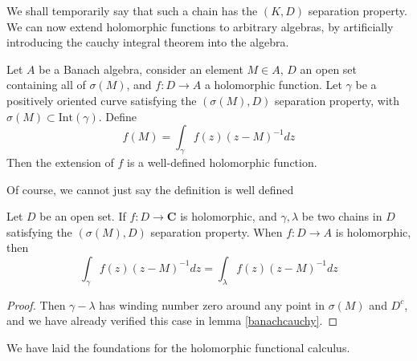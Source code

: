 We shall temporarily say that such a chain has the $(K,D)$ separation property. We can now extend holomorphic functions to arbitrary algebras, by artificially introducing the cauchy integral theorem into the algebra.

\begin{definition}
    Let $A$ be a Banach algebra, consider an element $M \in A$, $D$ an open set containing all of $\sigma(M)$, and $f:D \to A$ a holomorphic function. Let $\gamma$ be a positively oriented curve satisfying the $(\sigma(M), D)$ separation property, with $\sigma(M) \subset \text{Int}(\gamma)$. Define
    \[ f(M) = \int_\gamma f(z) (z - M)^{-1} dz \]
    Then the extension of $f$ is a well-defined holomorphic function.
\end{definition}

Of course, we cannot just say the definition is well defined

\begin{lemma}
    Let $D$ be an open set. If $f: D \to \mathbf{C}$ is holomorphic, and $\gamma, \lambda$ be two chains in $D$ satisfying the $(\sigma(M), D)$ separation property. When $f: D \to A$ is holomorphic, then
    \[ \int_\gamma f(z) (z - M)^{-1} dz = \int_\lambda f(z) (z - M)^{-1} dz \]
\end{lemma}
\begin{proof}
    Then $\gamma - \lambda$ has winding number zero around any point in $\sigma(M)$ and $D^c$, and we have already verified this case in lemma \ref{banachcauchy}.
\end{proof}

We have laid the foundations for the holomorphic functional calculus.

